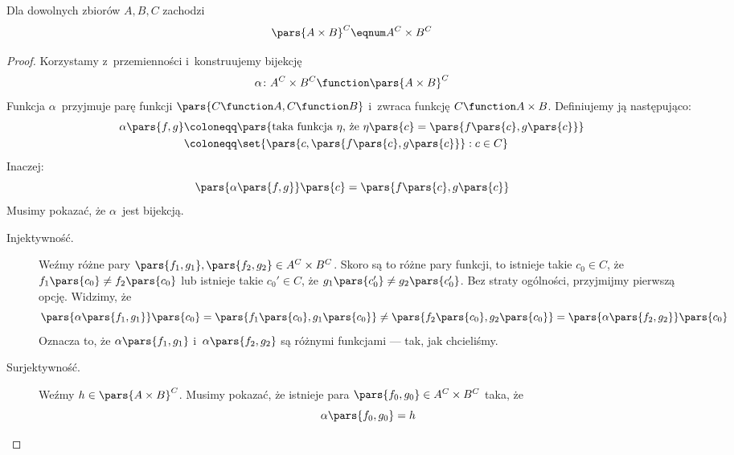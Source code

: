 \begin{theorem}
	Dla dowolnych zbiorów \(A, B, C\) zachodzi
	\begin{equation*}
		\pars{A \times B}^C \eqnum A^C \times B^C
	\end{equation*}
\end{theorem}
\begin{proof}
	Korzystamy z~przemienności i~konstruujemy bijekcję
	\begin{equation*}
		\alpha\colon A^C \times B^C \function \pars{A \times B}^C
	\end{equation*}
	Funkcja \(\alpha\)~przyjmuje parę funkcji \(\pars{C \function A, C \function B}\) i~zwraca funkcję \(C \function A \times B\). Definiujemy ją następująco:
	\begin{equation*}
		\begin{split}
			\alpha\pars{f, g}
			 & \coloneqq \pars{\text{taka funkcja \(\eta\), że \(\eta\pars{c} = \pars{f\pars{c}, g\pars{c}}\)}} \\
			 & \coloneqq \set{\pars{c, \pars{f\pars{c}, g\pars{c}}} : c \in C}
		\end{split}
	\end{equation*}
	Inaczej:
	\begin{equation*}
		\pars{\alpha\pars{f, g}}\pars{c} = \pars{f\pars{c}, g\pars{c}}
	\end{equation*}
	Musimy pokazać, że \(\alpha\)~jest bijekcją.
	\begin{description}
		\item[Injektywność.] Weźmy różne pary \(\pars{f_1, g_1}, \pars{f_2, g_2} \in A^C \times B^C\). Skoro są to różne pary funkcji, to istnieje takie \(c_0 \in C\), że \(f_1\pars{c_0} \neq f_2\pars{c_0}\) lub istnieje takie \(c_0' \in C\), że \(g_1\pars{c_0'} \neq g_2\pars{c_0'}\). Bez straty ogólności, przyjmijmy pierwszą opcję. Widzimy, że
		      \begin{equation*}
			      \pars{\alpha\pars{f_1, g_1}}\pars{c_0} = \pars{f_1\pars{c_0}, g_1\pars{c_0}} \neq \pars{f_2\pars{c_0}, g_2\pars{c_0}} = \pars{\alpha\pars{f_2, g_2}}\pars{c_0}
		      \end{equation*}
		      Oznacza to, że \(\alpha\pars{f_1, g_1}\) i~\(\alpha\pars{f_2, g_2}\) są różnymi funkcjami --- tak, jak chcieliśmy.
		\item[Surjektywność.] Weźmy \(h \in \pars{A \times B}^C\). Musimy pokazać, że istnieje para \(\pars{f_0, g_0} \in A^C \times B^C\) taka, że
		      \begin{equation*}
			      \alpha\pars{f_0, g_0} = h
		      \end{equation*}

\end{description}
\end{proof}
